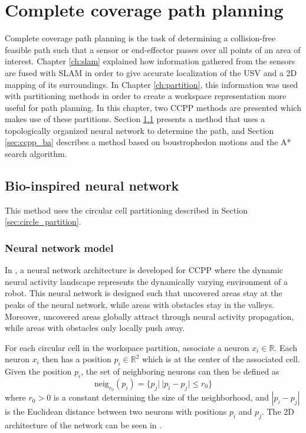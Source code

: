 \chapter{Complete coverage path planning} \label{ch:ccpp}


Complete coverage path planning is the task of determining a collision-free feasible path such that a sensor or end-effector passes over all points of an area of interest. Chapter \ref{ch:slam} explained how information gathered from the sensors are fused with SLAM in order to give accurate localization of the USV and a 2D mapping of its surroundings. In Chapter \ref{ch:partition}, this information was used with partitioning methods in order to create a workspace representation more useful for path planning. In this chapter, two CCPP methods are presented which makes use of these partitions. Section \ref{sec:ccpp_binn} presents a method that uses a topologically organized neural network to determine the path, and Section \ref{sec:ccpp_ba} describes a method based on boustrophedon motions and the A* search algorithm. 

\section{Bio-inspired neural network} \label{sec:ccpp_binn}

This method uses the circular cell partitioning described in Section \ref{sec:circle_partition}.

\subsection{Neural network model}

In \citet{yang2004neural}, a neural network architecture is developed for CCPP where the dynamic neural activity landscape represents the dynamically varying environment of a robot. This neural network is designed such that uncovered areas stay at the peaks of the neural network, while areas with obstacles stay in the valleys. Moreover, uncovered areas globally attract through neural activity propagation, while areas with obstacles only locally push away.

For each circular cell in the workspace partition, associate a neuron $x_i \in \mathbb{R}$. Each neuron $x_i$ then has a position $p_i \in \mathbb{R}^2$ which is at the center of the associated cell. Given the position $p_i$, the set of neighboring neurons can then be defined as
\begin{equation}
\text{neig}_{r_0}(p_i) = \{p_j|\ |p_i-p_j| \leq r_0\}
\end{equation}
where $r_0 > 0$ is a constant determining the size of the neighborhood, and $|p_i-p_j|$ is the Euclidean distance between two neurons with positions $p_i$ and $p_j$. The 2D architecture of the network can be seen in .

